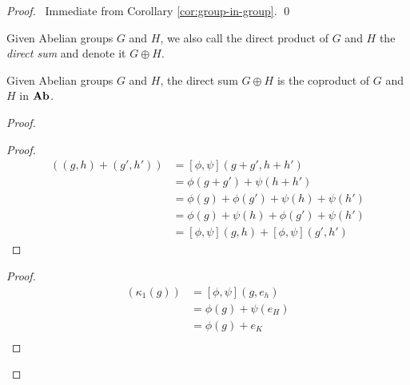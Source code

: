 \begin{proof}
\pf\ Immediate from Corollary \ref{cor:group-in-group}. \qed
\end{proof}

\begin{df}
    Given Abelian groups $G$ and $H$, we also call the direct product of $G$ and $H$ the \emph{direct sum} and denote it $G \oplus H$.
\end{df}

\begin{prop}
    Given Abelian groups $G$ and $H$, the direct sum $G \oplus H$ is the coproduct of $G$ and $H$ in $\mathbf{Ab}$.
\end{prop}

\begin{proof}
    \pf
    \begin{proof}
        \pf
        \begin{align*}
            [\phi,\psi]((g,h) + (g',h')) & = [\phi,\psi](g + g', h + h')             \\
                                         & = \phi(g + g') + \psi(h + h')             \\
                                         & = \phi(g) + \phi(g') + \psi(h) + \psi(h') \\
                                         & = \phi(g) + \psi(h) + \phi(g') + \psi(h') \\
                                         & = [\phi,\psi](g,h) + [\phi,\psi](g',h')
        \end{align*}
    \end{proof}
    \begin{proof}
        \pf
        \begin{align*}
            [\phi,\psi](\kappa_1(g)) & = [\phi,\psi](g,e_h)  \\
                                     & = \phi(g) + \psi(e_H) \\
                                     & = \phi(g) + e_K       \\

\end{align*}
\end{proof}
\end{proof}
